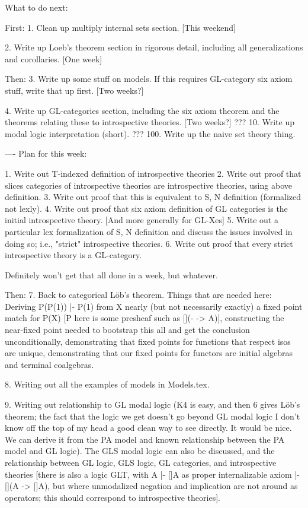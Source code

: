 What to do next:

First:
1. Clean up multiply internal sets section. [This weekend]

2. Write up Loeb's theorem section in rigorous detail, including all generalizations and corollaries. [One week]

Then:
3. Write up some stuff on models. If this requires GL-category six axiom stuff, write that up first. [Two weeks?]

4. Write up GL-categories section, including the six axiom theorem and the theorems relating these to introspective theories. [Two weeks?]
???
10. Write up modal logic interpretation (short).
???
100. Write up the naive set theory thing.

----
Plan for this week:

1. Write out T-indexed definition of introspective theories
2. Write out proof that slices categories of introspective theories are introspective theories, using above definition.
3. Write out proof that this is equivalent to S, N definition (formalized not lexly).
4. Write out proof that six axiom definition of GL categories is the initial introspective theory. [And more generally for GL-Xes]
5. Write out a particular lex formalization of S, N definition and discuss the issues involved in doing so; i.e., "strict" introspective theories.
6. Write out proof that every strict introspective theory is a GL-category.

Definitely won't get that all done in a week, but whatever.

Then:
7. Back to categorical Löb's theorem. Things that are needed here: Deriving P(P(1)) |- P(1) from X nearly (but not necessarily exactly) a fixed point match for P(X) [P here is some presheaf such as [](- -> A)], constructing the near-fixed point needed to bootstrap this all and get the conclusion unconditionally, demonstrating that fixed points for functions that respect isos are unique, demonstrating that our fixed points for functors are initial algebras and terminal coalgebras.

8. Writing out all the examples of models in Models.tex.

9. Writing out relationship to GL modal logic (K4 is easy, and then 6 gives Löb's theorem; the fact that the logic we get doesn't go beyond GL modal logic I don't know off the top of my head a good clean way to see directly. It would be nice. We can derive it from the PA model and known relationship between the PA model and GL logic). The GLS modal logic can also be discussed, and the relationship between GL logic, GLS logic, GL categories, and introspective theories [there is also a logic GLT, with A |- []A as proper internalizable axiom |- [](A -> []A), but where unmodalized negation and implication are not around as operators; this should correspond to introspective theories].

